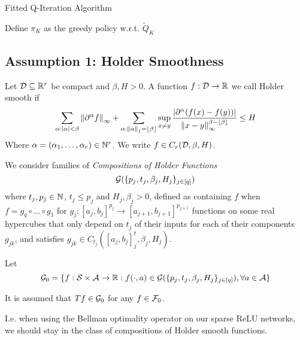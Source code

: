 \begin{algorithm}[H]
	\caption{Fitted Q-Iteration Algorithm}
	Define $\pi_K$ as the greedy policy w.r.t. $\widetilde{Q}_K$ \\
\end{algorithm}

\subsection{Assumption 1: Holder Smoothness} %
\begin{Definition}
	Let $\mathcal{D}\subseteq \mathbb{R}^r$ be compact and $\beta,H>0$. A function $f:\mathcal{D}\to \mathbb{R}$
	we call Holder smooth if
	\[ \sum_{{\alpha} : |{\alpha}| < \beta}
		\left\lVert\partial^{\alpha}f\right\rVert_\infty +
		\sum_{{\alpha} : \left\lVert{\alpha}\right\rVert_1 = \lfloor\beta\rfloor}
		\sup_{x \neq y} \frac{|\partial^\alpha (f(x) - f(y))|}
		{\left\lVert x-y\right\rVert_\infty^{\beta-\lfloor\beta\rfloor}} \leq H \] 
	Where $\alpha = (\alpha_1, \dots, \alpha_r) \in \mathbb{N}^r$.
	We write $f \in C_r(\mathcal{D}, \beta, H)$.
\end{Definition}

\begin{Definition}
	We consider families of \emph{Compositions of Holder Functions}
	\[ \mathcal{G}(\{p_j, t_j, \beta_j, H_j\}_{j \in [q]}) \]
	where $t_j, p_j \in \mathbb{N}$, $t_j\leq p_j$ and $H_j, \beta_j > 0$,
	defined as containing $f$ when $f = g_q \circ \dots \circ g_1$
	for $g_j : [a_j, b_j]^{p_j} \to [a_{j+1}, b_{j+1}]^{p_{j+1}}$
	functions on some real hypercubes that only depend on $t_j$ of their inputs
	for each of their components $g_{jk}$,
	and satisfies $g_{jk} \in C_{t_j}([a_j, b_j]^t_j, \beta_j, H_j)$.
\end{Definition}

\begin{Assumption}\label{asm:A1}
	Let
	\[ \mathcal{G}_0 = \{ f : \mathcal{S} \times \mathcal{A} \to \mathbb{R} : f(\cdot, a) \in
		\mathcal{G}(\{p_j, t_j, \beta_j, H_j \}_{j \in [q]} ), \forall a\in \mathcal{A} \} \]
	
	It is assumed that $T f \in \mathcal{G}_0$ for any $f \in \mathcal{F}_0$.

	I.e. when using the Bellman optimality operator on our sparse ReLU networks,
	we should stay in the class of compositions of Holder smooth functions.
\end{Assumption}

